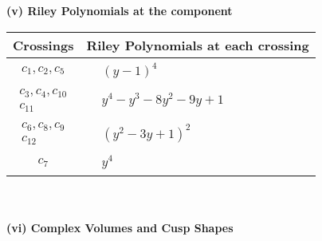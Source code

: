 \documentclass[1p]{elsarticle_modified}
\theoremstyle{definition}
\begin{document}
\newpage\renewcommand{\arraystretch}{1}
\flushleft \textbf{(v) Riley Polynomials at the component}\newline \\
\begin{tabular}{m{50pt}|m{274pt}}
Crossings & \hspace{64pt}Riley Polynomials at each crossing \\
\hline $$\begin{aligned}c_{1},c_{2},c_{5}\end{aligned}$$&$\begin{aligned}
&(y-1)^4
\end{aligned}$\\
\hline $$\begin{aligned}c_{3},c_{4},c_{10}\\c_{11}\end{aligned}$$&$\begin{aligned}
&y^4- y^3-8 y^2-9 y+1
\end{aligned}$\\
\hline $$\begin{aligned}c_{6},c_{8},c_{9}\\c_{12}\end{aligned}$$&$\begin{aligned}
&(y^2-3 y+1)^2
\end{aligned}$\\
\hline $$\begin{aligned}c_{7}\end{aligned}$$&$\begin{aligned}
&y^4
\end{aligned}$\\
\hline
\end{tabular}\\~\\
\newpage\flushleft \textbf{(vi) Complex Volumes and Cusp Shapes}
\end{document}
